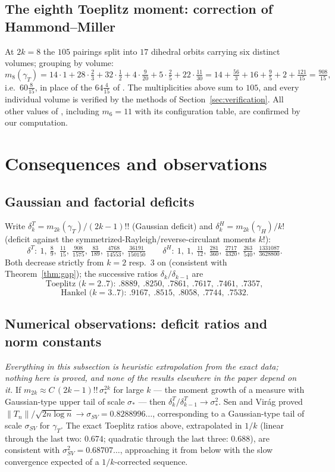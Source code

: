 ﻿\documentclass[11pt]{article}
\theoremstyle{remark}
\newcommand{\gT}{\gamma_T}
\newcommand{\gH}{\gamma_H}
\begin{document}
\subsection{The eighth Toeplitz moment: correction of Hammond--Miller}
\label{sec:correction}
At $2k=8$ the $105$ pairings split into $17$ dihedral orbits carrying six distinct
volumes; grouping by volume:
\[
m_8(\gT)=14\cdot1+28\cdot\tfrac23+32\cdot\tfrac12+4\cdot\tfrac9{20}
+5\cdot\tfrac25+22\cdot\tfrac{11}{30}
=14+\tfrac{56}3+16+\tfrac95+2+\tfrac{121}{15}=\tfrac{908}{15},
\]
i.e.\ $60\tfrac8{15}$, in place of the $64\tfrac4{15}$ of \cite{HM}. The
multiplicities above sum to $105$, and every individual volume is verified by the
methods of Section~\ref{sec:verification}. All other values of \cite{HM}, including
$m_6=11$ with its configuration table, are confirmed by our computation.

\section{Consequences and observations}\label{sec:consequences}

\subsection{Gaussian and factorial deficits}
Write $\delta^T_k=m_{2k}(\gT)/(2k-1)!!$ (Gaussian deficit) and
$\delta^H_k=m_{2k}(\gH)/k!$ (deficit against the symmetrized-Rayleigh/reverse-circulant
moments $k!$):
\[
\delta^T:\ 1,\ \tfrac89,\ \tfrac{11}{15},\ \tfrac{908}{1575},\ \tfrac{83}{189},\
\tfrac{4768}{14553},\ \tfrac{36191}{150150}
\qquad
\delta^H:\ 1,\ 1,\ \tfrac{11}{12},\ \tfrac{281}{360},\ \tfrac{2717}{4320},\
\tfrac{263}{540},\ \tfrac{1331087}{3628800}.
\]
Both decrease strictly from $k=2$ resp.\ $3$ on (consistent with
Theorem~\ref{thm:gap}); the successive ratios $\delta_k/\delta_{k-1}$ are
\[
\text{Toeplitz ($k=2..7$): } .8889,\ .8250,\ .7861,\ .7617,\ .7461,\ .7357,
\]
\[
\text{Hankel ($k=3..7$): } .9167,\ .8515,\ .8058,\ .7744,\ .7532 .
\]

\subsection{Numerical observations: deficit ratios and norm constants}
\emph{Everything in this subsection is heuristic extrapolation from the exact data;
nothing here is proved, and none of the results elsewhere in the paper depend on it.}
If $m_{2k}\approx C\,(2k-1)!!\,\sigma_*^{2k}$ for large $k$ --- the moment growth of a
measure with Gaussian-type upper tail of scale $\sigma_*$ --- then
$\delta^T_k/\delta^T_{k-1}\to\sigma_*^2$. Sen and Vir\'ag \cite{SV2} proved
$\|T_n\|/\sqrt{2n\log n}\to\sigma_{SV}=0.8288996\dots$, corresponding to a
Gaussian-type tail of scale $\sigma_{SV}$ for $\gT$. The exact Toeplitz ratios above,
extrapolated in $1/k$ (linear through the last two: $0.674$; quadratic through the
last three: $0.688$), are consistent with $\sigma_{SV}^2=0.68707\ldots$,
approaching it from below with the slow convergence expected of a $1/k$-corrected
sequence.
\end{document}
